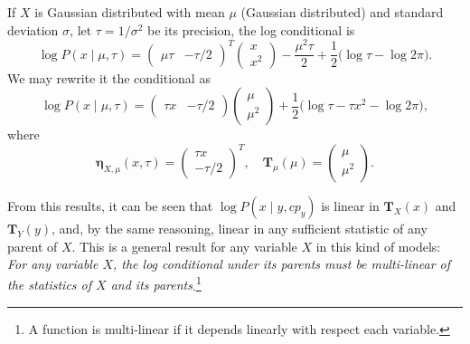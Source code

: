 \begin{exampleth}
    If \( X \) is Gaussian distributed with mean \( \mu \) (Gaussian distributed) and standard deviation \( \sigma \), let \(\tau = 1/\sigma^{2}\) be its precision,  the log conditional is
    \[
         \log P(x \mid \mu, \tau) =
         \begin{pmatrix}
             \mu \tau & -\tau/2
         \end{pmatrix}^T
         \begin{pmatrix}
             x\\
             x^2
         \end{pmatrix}
         - \frac{\mu^{2}\tau}{2} + \frac{1}{2}\big( \log \tau - \log 2\pi \big).
    \]
    We may rewrite it the conditional as
    \[
         \log  P(x \mid \mu, \tau) =
         \begin{pmatrix}
             \tau x & -\tau/2
         \end{pmatrix}
         \begin{pmatrix}
             \mu\\
             \mu^2
         \end{pmatrix}
         + \frac{1}{2}\big( \log \tau - \tau x^2 - \log 2\pi \big),
    \]
    where
    \[
         \bm{\eta}_{X,\mu}(x,\tau) =  \begin{pmatrix}
            \tau x\\
            -\tau/2
        \end{pmatrix}^T,\quad \bm{T}_\mu(\mu)=  \begin{pmatrix}
            \mu\\
            \mu^2
        \end{pmatrix}.
    \]
\end{exampleth}

From this results, it can be seen that \( \log P(x \mid y , cp_y) \) is linear in \( \bm{T}_X(x) \) and \( \bm{T}_Y(y) \), and, by the same reasoning, linear in any sufficient statistic of any parent of \( X \). This is a general result for any variable \( X \) in this kind of models: \emph{For any variable \( X \), the log conditional under its parents must be multi-linear of the statistics of \( X \) and its parents}.\footnote{A function is multi-linear if it depends linearly with respect each variable.}

